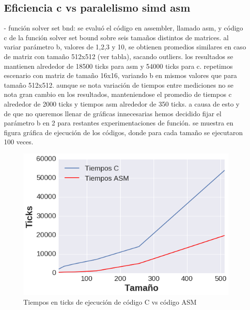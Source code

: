 \subsection{Eficiencia c vs paralelismo simd asm}
- función solver set bnd:
se evaluó el código en assembler, llamado asm, y código c de la función solver set bound sobre seis tamaños distintos de matrices. al variar parámetro b, valores de 1,2,3 y 10, se obtienen promedios similares en caso de matriz con tamaño 512x512 (ver tabla), sacando outliers. los resultados se mantienen alrededor de 18500 ticks para asm y 54000 ticks para c. 
repetimos escenario con matriz de tamaño 16x16, variando b en mismos valores que para tamaño 512x512. aunque se nota 
variación de tiempos entre mediciones no se nota gran cambio en los resultados, manteniendose el promedio de tiempos c alrededor de 2000 ticks y tiempos asm alrededor de 350 ticks.
a causa de esto y de que no queremos llenar de gráficas innecesarias hemos decidido fijar el parámetro b en 2 para restantes experimentaciones de función. 
se muestra en figura gráfica de ejecución de los códigos, donde para cada tamaño se ejecutaron 100 veces.

\begin{figure}[h]
\centering
\includegraphics[scale=0.4] {grafC}
\caption{Tiempos en ticks de ejecución de código C vs código ASM}
\end{figure}



